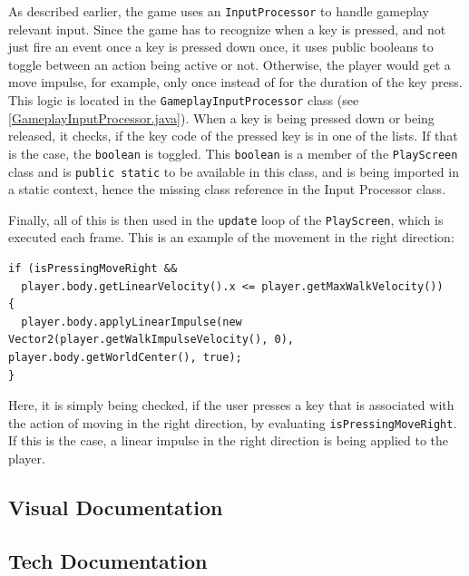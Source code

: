 \documentclass[12p]{article}
\begin{document}
As described earlier, the game uses an \texttt{InputProcessor} to handle gameplay relevant input. Since the game has to recognize when a key is pressed, and not just fire an event once a key is pressed down once, it uses public booleans to toggle between an action being active or not. Otherwise, the player would get a move impulse, for example, only once instead of for the duration of the key press. This logic is located in the \texttt{GameplayInputProcessor} class (see \ref{GameplayInputProcessor.java}). When a key is being pressed down or being released, it checks, if the key code of the pressed key is in one of the lists. If that is the case, the \texttt{boolean} is toggled. This \texttt{boolean} is a member of the \texttt{PlayScreen} class and is \texttt{public static} to be available in this class, and is being imported in a static context, hence the missing class reference in the Input Processor class.

Finally, all of this is then used in the \texttt{update} loop of the \texttt{PlayScreen}, which is executed each frame. This is an example of the movement in the right direction:

\begin{verbatim}
if (isPressingMoveRight &&
  player.body.getLinearVelocity().x <= player.getMaxWalkVelocity()) 
{
  player.body.applyLinearImpulse(new Vector2(player.getWalkImpulseVelocity(), 0), player.body.getWorldCenter(), true);
}
\end{verbatim}

Here, it is simply being checked, if the user presses a key that is associated with the action of moving in the right direction, by evaluating \texttt{isPressingMoveRight}. If this is the case, a linear impulse in the right direction is being applied to the player.


\subsection{Visual Documentation} \label{DocVisual}


\subsection{Tech Documentation} \label{DocTech}

\end{document}

